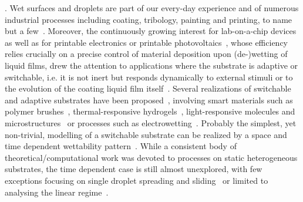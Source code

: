 \documentclass[twocolumn,amsmath,amssymb,showpacs,prl,superscriptaddress]{revtex4-1} %
\begin{document}
\maketitle

\newcommand{\ts}{\textsuperscript}

. Wet surfaces and droplets are part of our every-day experience and of numerous industrial processes including coating, tribology, painting and printing, to name but a few~\cite{gross1980fluid,szeri2010fluid,doi:10.1146/annurev.fluid.31.1.347,DASILVASOBRINHO19991204,singh2010inkjet,Wijshoff2010}. 
Moreover, the continuously growing interest for lab-on-a-chip devices~\cite{C6LC00387G,Focke} as well as for printable electronics or printable photovoltaics~\cite{Luechinger_2008,RH22}, whose efficiency relies crucially on a precise control of material deposition upon (de-)wetting of liquid films, drew the attention to applications where the substrate is adaptive or switchable, i.e. it is not inert but responds dynamically to external stimuli or to the evolution of the coating liquid film itself~\cite{ButtEtAl_Langmuir2018}. 
Several realizations of switchable and adaptive substrates have been proposed~\cite{XiCSR2010}, involving smart materials such as polymer brushes~\cite{CohenStuartEtAl_NatMat2010}, thermal-responsive hydrogels~\cite{ChenEtAl_SM2010}, light-responsive molecules and microstructures~\cite{IchimuraEtAl_Science2000} or processes such as electrowetting~\cite{MugeleEtAl_JPCM2005}.
Probably the simplest, yet non-trivial, modelling of a switchable substrate can be realized by a space and time dependent wettability pattern~\cite{GrawitterStark1}. 
While a consistent body of theoretical/computational work was devoted to processes on static heterogeneous substrates, the time dependent case is still almost unexplored, with few exceptions focusing on single droplet spreading and sliding~\cite{GrawitterStark1,GrawitterStark2,ThieleHartmann} or limited to analysing the linear regime~\cite{suman2006dynamics}.
\end{document}
